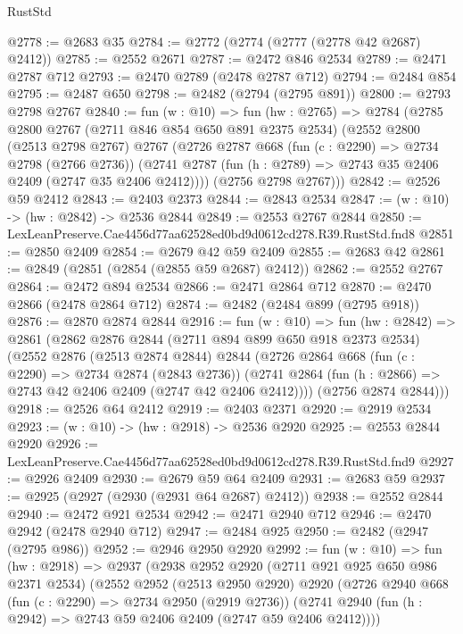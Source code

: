\begin{lexlean}{RustStd}
\begin{coremodule}
@2778 := @2683 @35
@2784 := @2772 (@2774 (@2777 (@2778 @42 @2687) @2412))
@2785 := @2552 @2671
@2787 := @2472 @846 @2534
@2789 := @2471 @2787 @712
@2793 := @2470 @2789 (@2478 @2787 @712)
@2794 := @2484 @854
@2795 := @2487 @650
@2798 := @2482 (@2794 (@2795 @891))
@2800 := @2793 @2798 @2767
@2840 := fun (w : @10) =>
  fun (hw : @2765) =>
  @2784
    (@2785
      @2800
      @2767
      (@2711 @846 @854 @650 @891 @2375 @2534)
      (@2552
        @2800
        (@2513 @2798 @2767)
        @2767
        (@2726
          @2787
          @668
          (fun (c : @2290) => @2734 @2798 (@2766 @2736))
          (@2741 @2787 (fun (h : @2789) => @2743 @35 @2406 @2409 (@2747 @35 @2406 @2412))))
        (@2756 @2798 @2767)))
@2842 := @2526 @59 @2412
@2843 := @2403 @2373
@2844 := @2843 @2534
@2847 := (w : @10) -> (hw : @2842) -> @2536 @2844
@2849 := @2553 @2767 @2844
@2850 := LexLeanPreserve.Cae4456d77aa62528ed0bd9d0612cd278.R39.RustStd.fnd8
@2851 := @2850 @2409
@2854 := @2679 @42 @59 @2409
@2855 := @2683 @42
@2861 := @2849 (@2851 (@2854 (@2855 @59 @2687) @2412))
@2862 := @2552 @2767
@2864 := @2472 @894 @2534
@2866 := @2471 @2864 @712
@2870 := @2470 @2866 (@2478 @2864 @712)
@2874 := @2482 (@2484 @899 (@2795 @918))
@2876 := @2870 @2874 @2844
@2916 := fun (w : @10) =>
  fun (hw : @2842) =>
  @2861
    (@2862
      @2876
      @2844
      (@2711 @894 @899 @650 @918 @2373 @2534)
      (@2552
        @2876
        (@2513 @2874 @2844)
        @2844
        (@2726
          @2864
          @668
          (fun (c : @2290) => @2734 @2874 (@2843 @2736))
          (@2741 @2864 (fun (h : @2866) => @2743 @42 @2406 @2409 (@2747 @42 @2406 @2412))))
        (@2756 @2874 @2844)))
@2918 := @2526 @64 @2412
@2919 := @2403 @2371
@2920 := @2919 @2534
@2923 := (w : @10) -> (hw : @2918) -> @2536 @2920
@2925 := @2553 @2844 @2920
@2926 := LexLeanPreserve.Cae4456d77aa62528ed0bd9d0612cd278.R39.RustStd.fnd9
@2927 := @2926 @2409
@2930 := @2679 @59 @64 @2409
@2931 := @2683 @59
@2937 := @2925 (@2927 (@2930 (@2931 @64 @2687) @2412))
@2938 := @2552 @2844
@2940 := @2472 @921 @2534
@2942 := @2471 @2940 @712
@2946 := @2470 @2942 (@2478 @2940 @712)
@2947 := @2484 @925
@2950 := @2482 (@2947 (@2795 @986))
@2952 := @2946 @2950 @2920
@2992 := fun (w : @10) =>
  fun (hw : @2918) =>
  @2937
    (@2938
      @2952
      @2920
      (@2711 @921 @925 @650 @986 @2371 @2534)
      (@2552
        @2952
        (@2513 @2950 @2920)
        @2920
        (@2726
          @2940
          @668
          (fun (c : @2290) => @2734 @2950 (@2919 @2736))
          (@2741 @2940 (fun (h : @2942) => @2743 @59 @2406 @2409 (@2747 @59 @2406 @2412))))

\end{coremodule}
\end{lexlean}
